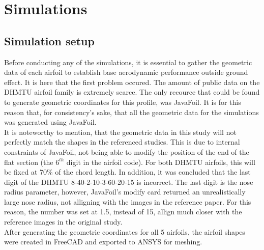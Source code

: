 \section{Simulations}

\subsection{Simulation setup}

Before conducting any of the simulations, it is essential to gather the geometric data of each airfoil to establish base aerodynamic performance outside ground effect. It is here that the first problem occured. The amount of public data on the DHMTU airfoil family is extremely scarce. The only recource that could be found to generate geometric coordinates for this profile, was JavaFoil. It is for this reason that, for consistency's sake, that all the geometric data for the simulations was generated using JavaFoil.\\

\noindent It is noteworthy to mention, that the geometric data in this study will not perfectly match the shapes in the referenced studies. This is due to internal constraints of JavaFoil, not being able to modify the position of the end of the flat section (the $6^{th}$ digit in the airfoil code). For both DHMTU airfoils, this will be fixed at 70\% of the chord length. In addition, it was concluded that the last digit of the DHMTU 8-40-2-10-3-60-20-15 is incorrect. The last digit is the nose radius parameter, however, JavaFoil's modify card returned an unrealistically large nose radius, not alligning with the images in the reference paper. For this reason, the number was set at 1.5, instead of 15, allign much closer with the reference images in the original study.\\

After generating the geometric coordinates for all 5 airfoils, the airfoil shapes were created in FreeCAD and exported to ANSYS for meshing.